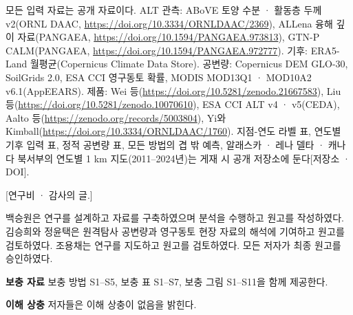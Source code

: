 \ifnum{}
모든 입력 자료는 공개 자료이다. ALT 관측: ABoVE 토양 수분 · 활동층 두께 v2(ORNL DAAC, \url{https://doi.org/10.3334/ORNLDAAC/2369}), ALLena 융해 깊이 자료(PANGAEA, \url{https://doi.org/10.1594/PANGAEA.973813}), GTN-P CALM(PANGAEA, \url{https://doi.org/10.1594/PANGAEA.972777}). 기후: ERA5-Land 월평균(Copernicus Climate Data Store). 공변량: Copernicus DEM GLO-30, SoilGrids 2.0, ESA CCI 영구동토 확률, MODIS MOD13Q1 · MOD10A2 v6.1(AppEEARS). 제품: Wei 등(\url{https://doi.org/10.5281/zenodo.21667583}), Liu 등(\url{https://doi.org/10.5281/zenodo.10070610}), ESA CCI ALT v4 · v5(CEDA), Aalto 등(\url{https://zenodo.org/records/5003804}), Yi와 Kimball(\url{https://doi.org/10.3334/ORNLDAAC/1760}). 지점-연도 라벨 표, 연도별 기후 입력 표, 정적 공변량 표, 모든 방법의 겹 밖 예측, 알래스카 · 레나 델타 · 캐나다 북서부의 연도별 1 km 지도(2011--2024년)는 게재 시 공개 저장소에 둔다[저장소 · DOI].
\fi

\ifnum{}
[연구비 · 감사의 글.]

백승원은 연구를 설계하고 자료를 구축하였으며 분석을 수행하고 원고를 작성하였다. 김승희와 정윤택은 원격탐사 공변량과 영구동토 현장 자료의 해석에 기여하고 원고를 검토하였다. 조용채는 연구를 지도하고 원고를 검토하였다. 모든 저자가 최종 원고를 승인하였다.

\textbf{보충 자료} 보충 방법 S1--S5, 보충 표 S1--S7, 보충 그림 S1--S11을 함께 제공한다.

\textbf{이해 상충} 저자들은 이해 상충이 없음을 밝힌다.
\fi
